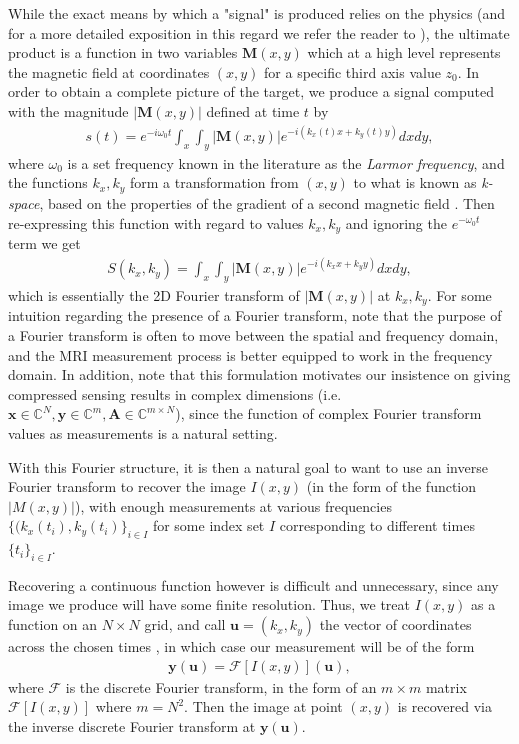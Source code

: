 \documentclass[12pt,a4paper]{amsart}
\numberwithin{equation}{section}
\theoremstyle{plain}
\theoremstyle{definition}
\newcommand{\BC}{\mathbb C}
\newcommand{\bdy}{\mathbf{y}}
\newcommand{\bdx}{\mathbf{x}}
\newcommand{\bdu}{\mathbf{u}}
\newcommand{\bdA}{\mathbf{A}}
\newcommand{\bdM}{\mathbf{M}}
\begin{document}
While the exact means by which a "signal" is produced relies on the physics (and for a more detailed exposition in this regard we refer the reader to \cite{wm}), the ultimate product is a function in two variables $\bdM(x,y)$ which at a high level represents the magnetic field at coordinates $(x,y)$ for a specific third axis value $z_0$. In order to obtain a complete picture of the target, we produce a signal computed with the magnitude $|\bdM(x,y)|$ defined at time $t$ by 
\begin{align}
    s(t)=e^{-i\omega_0t}\int_x\int_y|\bdM(x,y)|e^{-i(k_x(t)x+k_y(t)y)}dxdy,
\end{align}
where $\omega_0$ is a set frequency known in the literature as the \textit{Larmor frequency}, and the functions $k_x,k_y$ form a transformation from $(x,y)$ to what is known as \textit{k-space}, based on the properties of the gradient of a second magnetic field \cite{wm}. Then re-expressing this function with regard to values $k_x,k_y$ and ignoring the $e^{-\omega_0t}$ term we get
\begin{align}
    S(k_x,k_y)=\int_x\int_y|\bdM(x,y)|e^{-i(k_xx+k_yy)}dxdy,
\end{align}
which is essentially the 2D Fourier transform of $|\bdM(x,y)|$ at $k_x,k_y$. For some intuition regarding the presence of a Fourier transform, note that the purpose of a Fourier transform is often to move between the spatial and frequency domain, and the MRI measurement process is better equipped to work in the frequency domain. In addition, note that this formulation motivates our insistence on giving compressed sensing results in complex dimensions (i.e. $\bdx\in\BC^N,\bdy\in\BC^m,\bdA\in\BC^{m\times N}$), since the function of complex Fourier transform values as measurements is a natural setting.

With this Fourier structure, it is then a natural goal to want to use an inverse Fourier transform to recover the image $I(x,y)$ (in the form of the function $|M(x,y)|$), with enough measurements at various frequencies $\{(k_x(t_i),k_y(t_i)\}_{i\in I}$ for some index set $I$ corresponding to different times $\{t_i\}_{i\in I}$. 

Recovering a continuous function however is difficult and unnecessary, since any image we produce will have some finite resolution. Thus, we treat $I(x,y)$ as a function on an $N\times N$ grid, and call $\bdu=(k_x,k_y)$ the vector of coordinates across the chosen times \cite{wm}, in which case our measurement will be of the form
\begin{align}\label{y-mri}
    \bdy(\bdu)=\mathcal{F}[I(x,y)](\bdu),
\end{align}
where $\mathcal{F}$ is the discrete Fourier transform, in the form of an $m\times m$ matrix $\mathcal{F}[I(x,y)]$ where $m=N^2$. Then the image at point $(x,y)$ is recovered via the inverse discrete Fourier transform at $\bdy(\bdu)$.
\end{document}
